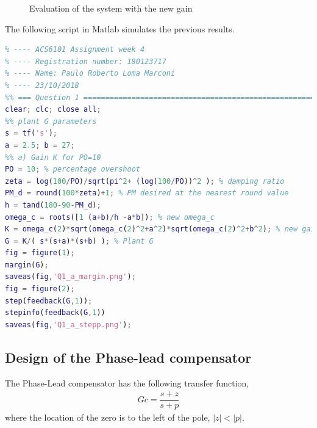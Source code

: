 \documentclass[11pt, a4paper]{article}
\begin{document}
\begin{figure}[H]
	\centering
	\caption{Evaluation of the system with the new gain }
	\label{fig:Q1_a}
\end{figure}

The following script in Matlab simulates the previous results.

\begin{lstlisting}[language=matlab, caption={}, label={}]
%% ========================================================================
% ---- ACS6101 Assignment week 4
% ---- Registration number: 180123717
% ---- Name: Paulo Roberto Loma Marconi
% ---- 23/10/2018
%% === Question 1 =========================================================
clear; clc; close all;
%% plant G parameters
s = tf('s');
a = 2.5; b = 27;
%% a) Gain K for PO=10
PO = 10; % percentage overshoot
zeta = log(100/PO)/sqrt(pi^2+ (log(100/PO))^2 ); % damping ratio
PM_d = round(100*zeta)+1; % PM desired at the nearest round value
h = tand(180-90-PM_d); 
omega_c = roots([1 (a+b)/h -a*b]); % new omega_c
K = omega_c(2)*sqrt(omega_c(2)^2+a^2)*sqrt(omega_c(2)^2+b^2); % new gain K
G = K/( s*(s+a)*(s+b) ); % Plant G
fig = figure(1);
margin(G);
saveas(fig,'Q1_a_margin.png');
fig = figure(2);
step(feedback(G,1));
stepinfo(feedback(G,1))
saveas(fig,'Q1_a_stepp.png');
\end{lstlisting}


\subsection{Design of the Phase-lead compensator}
The Phase-Lead compensator has the following transfer function,
\begin{align}
Gc = \dfrac{s+z}{s+p} \label{eq:Gc_lead}
\end{align}
where the location of the zero is to the left of the pole, $|z|<|p|$.
\end{document}
